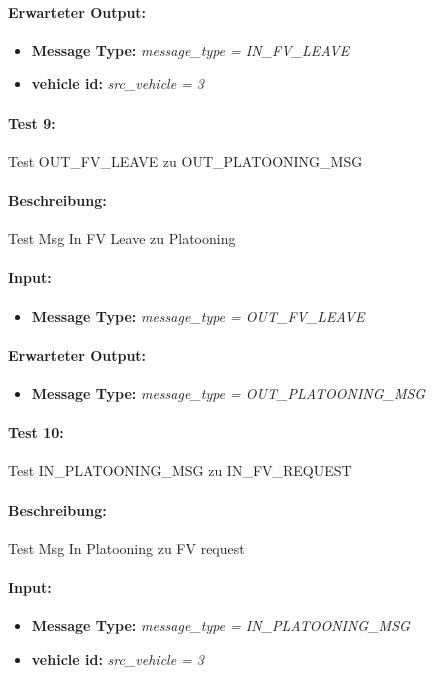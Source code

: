 \documentclass[a4paper, 12pt, titlepage]{scrartcl}
\begin{document}
{			\paragraph{Erwarteter Output:}
			\begin{itemize} \itemsep-0.5em
				\item \textbf{Message Type:} \emph{message\_type = IN\_FV\_LEAVE}
				\item \textbf{vehicle id:} \emph{src\_vehicle = 3}
			\end{itemize}
			
			\paragraph{Test 9:}{Test OUT\_FV\_LEAVE zu OUT\_PLATOONING\_MSG}
			\paragraph{Beschreibung:} Test Msg In FV Leave zu Platooning
			\paragraph{Input:}
			\begin{itemize} \itemsep-0.5em
				\item \textbf{Message Type:} \emph{message\_type = OUT\_FV\_LEAVE}
			\end{itemize}
			\paragraph{Erwarteter Output:}
			\begin{itemize} \itemsep-0.5em
				\item \textbf{Message Type:} \emph{message\_type = OUT\_PLATOONING\_MSG}
			\end{itemize}

			\paragraph{Test 10:}{Test IN\_PLATOONING\_MSG zu IN\_FV\_REQUEST}
			\paragraph{Beschreibung:} Test Msg In Platooning zu FV request
			\paragraph{Input:}
			\begin{itemize} \itemsep-0.5em
				\item \textbf{Message Type:} \emph{message\_type = IN\_PLATOONING\_MSG}
				\item \textbf{vehicle id:} \emph{src\_vehicle = 3}
			\end{itemize}
}
\end{document}
